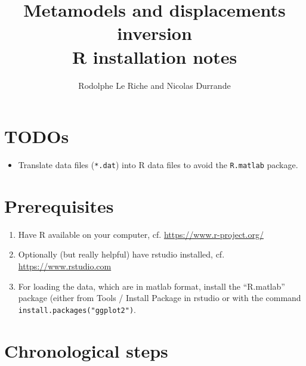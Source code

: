 \documentclass[12pt]{article}
\begin{document}
\title{Metamodels and displacements  inversion \\ R installation notes}
\author{Rodolphe Le Riche and Nicolas Durrande}
\maketitle

\section{TODOs}
\begin{itemize}
\item Translate data files (\texttt{*.dat}) into R data files to avoid the \texttt{R.matlab} package.
\end{itemize}

\section{Prerequisites}
\begin{enumerate}
\item Have R available on your computer, cf. \url{https://www.r-project.org/}
\item Optionally (but really helpful) have rstudio installed, cf. \url{https://www.rstudio.com}
\item For loading the data, which are in matlab format, install the ``R.matlab'' package (either from 
Tools / Install Package in rstudio or with the command \texttt{install.packages("ggplot2")}.
\end{enumerate}

\section{Chronological steps}
\end{document}
